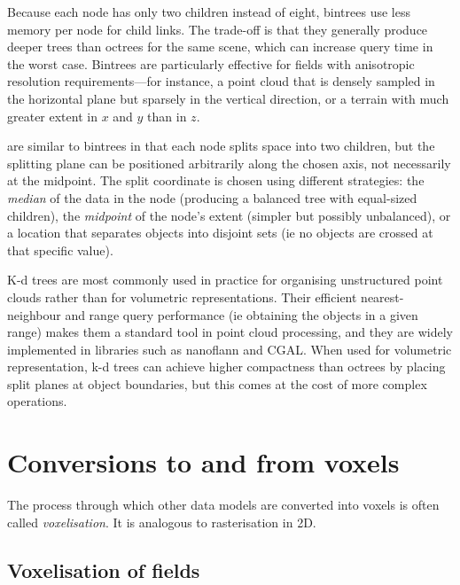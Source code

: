 \begin{description}
Because each node has only two children instead of eight, bintrees use less memory per node for child links.
The trade-off is that they generally produce deeper trees than octrees for the same scene, which can increase query time in the worst case.
Bintrees are particularly effective for fields with anisotropic resolution requirements---for instance, a point cloud that is densely sampled in the horizontal plane but sparsely in the vertical direction, or a terrain with much greater extent in \(x\) and \(y\) than in \(z\).

\item[\(k\)-d trees] are similar to bintrees in that each node splits space into two children, but the splitting plane can be positioned arbitrarily along the chosen axis, not necessarily at the midpoint.
The split coordinate is chosen using different strategies: the \emph{median} of the data in the node (producing a balanced tree with equal-sized children), the \emph{midpoint} of the node's extent (simpler but possibly unbalanced), or a location that separates objects into disjoint sets (ie no objects are crossed at that specific value).

K-d trees are most commonly used in practice for organising unstructured point clouds rather than for volumetric representations.
Their efficient nearest-neighbour and range query performance (ie obtaining the objects in a given range) makes them a standard tool in point cloud processing, and they are widely implemented in libraries such as nanoflann and CGAL.
When used for volumetric representation, k-d trees can achieve higher compactness than octrees by placing split planes at object boundaries, but this comes at the cost of more complex operations.

\end{description}

\section{Conversions to and from voxels}

The process through which other data models are converted into voxels is often called \emph{voxelisation}.
It is analogous to rasterisation in 2D.

\subsection{Voxelisation of fields}
 
